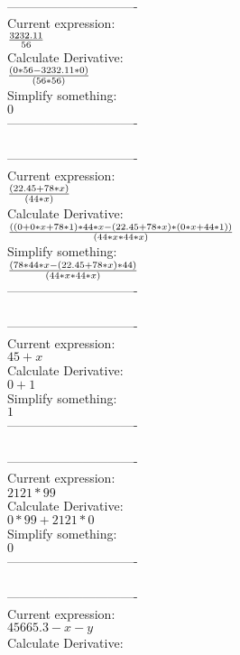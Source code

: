 \documentclass[12pt]{article}
\begin{document}
\\
-------------------------------\\
Current expression:\\
\( {{3232.11}\over{56}}\) \\
Calculate Derivative:\\
\( {{(0*56-3232.11*0)}\over{(56*56)}}\) \\
Simplify something:\\
\( 0\) \\
-------------------------------\\
\\
-------------------------------\\
Current expression:\\
\( {{(22.45+78*x)}\over{(44*x)}}\) \\
Calculate Derivative:\\
\( {{((0+0*x+78*1)*44*x-(22.45+78*x)*(0*x+44*1))}\over{(44*x*44*x)}}\) \\
Simplify something:\\
\( {{(78*44*x-(22.45+78*x)*44)}\over{(44*x*44*x)}}\) \\
-------------------------------\\
\\
-------------------------------\\
Current expression:\\
\( 45+x\) \\
Calculate Derivative:\\
\( 0+1\) \\
Simplify something:\\
\( 1\) \\
-------------------------------\\
\\
-------------------------------\\
Current expression:\\
\( 2121*99\) \\
Calculate Derivative:\\
\( 0*99+2121*0\) \\
Simplify something:\\
\( 0\) \\
-------------------------------\\
\\
-------------------------------\\
Current expression:\\
\( 45665.3-x-y\) \\
Calculate Derivative:\\
\end{document}
